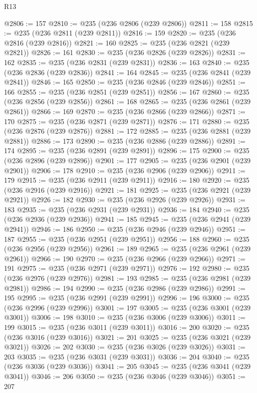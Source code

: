 \begin{lexlean}{R13}
\begin{coremodule}
@2806 := 157
@2810 := @235 (@236 @2806 (@239 @2806))
@2811 := 158
@2815 := @235 (@236 @2811 (@239 @2811))
@2816 := 159
@2820 := @235 (@236 @2816 (@239 @2816))
@2821 := 160
@2825 := @235 (@236 @2821 (@239 @2821))
@2826 := 161
@2830 := @235 (@236 @2826 (@239 @2826))
@2831 := 162
@2835 := @235 (@236 @2831 (@239 @2831))
@2836 := 163
@2840 := @235 (@236 @2836 (@239 @2836))
@2841 := 164
@2845 := @235 (@236 @2841 (@239 @2841))
@2846 := 165
@2850 := @235 (@236 @2846 (@239 @2846))
@2851 := 166
@2855 := @235 (@236 @2851 (@239 @2851))
@2856 := 167
@2860 := @235 (@236 @2856 (@239 @2856))
@2861 := 168
@2865 := @235 (@236 @2861 (@239 @2861))
@2866 := 169
@2870 := @235 (@236 @2866 (@239 @2866))
@2871 := 170
@2875 := @235 (@236 @2871 (@239 @2871))
@2876 := 171
@2880 := @235 (@236 @2876 (@239 @2876))
@2881 := 172
@2885 := @235 (@236 @2881 (@239 @2881))
@2886 := 173
@2890 := @235 (@236 @2886 (@239 @2886))
@2891 := 174
@2895 := @235 (@236 @2891 (@239 @2891))
@2896 := 175
@2900 := @235 (@236 @2896 (@239 @2896))
@2901 := 177
@2905 := @235 (@236 @2901 (@239 @2901))
@2906 := 178
@2910 := @235 (@236 @2906 (@239 @2906))
@2911 := 179
@2915 := @235 (@236 @2911 (@239 @2911))
@2916 := 180
@2920 := @235 (@236 @2916 (@239 @2916))
@2921 := 181
@2925 := @235 (@236 @2921 (@239 @2921))
@2926 := 182
@2930 := @235 (@236 @2926 (@239 @2926))
@2931 := 183
@2935 := @235 (@236 @2931 (@239 @2931))
@2936 := 184
@2940 := @235 (@236 @2936 (@239 @2936))
@2941 := 185
@2945 := @235 (@236 @2941 (@239 @2941))
@2946 := 186
@2950 := @235 (@236 @2946 (@239 @2946))
@2951 := 187
@2955 := @235 (@236 @2951 (@239 @2951))
@2956 := 188
@2960 := @235 (@236 @2956 (@239 @2956))
@2961 := 189
@2965 := @235 (@236 @2961 (@239 @2961))
@2966 := 190
@2970 := @235 (@236 @2966 (@239 @2966))
@2971 := 191
@2975 := @235 (@236 @2971 (@239 @2971))
@2976 := 192
@2980 := @235 (@236 @2976 (@239 @2976))
@2981 := 193
@2985 := @235 (@236 @2981 (@239 @2981))
@2986 := 194
@2990 := @235 (@236 @2986 (@239 @2986))
@2991 := 195
@2995 := @235 (@236 @2991 (@239 @2991))
@2996 := 196
@3000 := @235 (@236 @2996 (@239 @2996))
@3001 := 197
@3005 := @235 (@236 @3001 (@239 @3001))
@3006 := 198
@3010 := @235 (@236 @3006 (@239 @3006))
@3011 := 199
@3015 := @235 (@236 @3011 (@239 @3011))
@3016 := 200
@3020 := @235 (@236 @3016 (@239 @3016))
@3021 := 201
@3025 := @235 (@236 @3021 (@239 @3021))
@3026 := 202
@3030 := @235 (@236 @3026 (@239 @3026))
@3031 := 203
@3035 := @235 (@236 @3031 (@239 @3031))
@3036 := 204
@3040 := @235 (@236 @3036 (@239 @3036))
@3041 := 205
@3045 := @235 (@236 @3041 (@239 @3041))
@3046 := 206
@3050 := @235 (@236 @3046 (@239 @3046))
@3051 := 207

\end{coremodule}
\end{lexlean}
